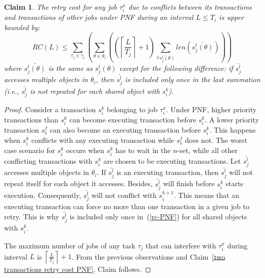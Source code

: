\documentclass[a4paper,english]{article}
\newtheorem{clm}{Claim}
\newtheorem{proof}{Proof}
\begin{document}
\begin{clm}
The retry cost for any job $\tau_{i}^{x}$ due to conflicts between its transactions and transactions of other jobs under PNF during an interval $L\le T_{i}$ is upper bounded by:
\begin{equation}
RC(L)\le\sum_{\tau_{j}\in\gamma_{i}}\left(\sum_{\theta\in\theta_{i}}\left(\left(\left\lceil \frac{L}{T_{j}}\right\rceil +1\right)\sum_{\bar{\forall s_{j}^{l}(\theta)}}len\left(\bar{s_{j}^{l}(\theta)}\right)\right)\right)\label{rc-PNF}
\end{equation}
where $\bar{s_{j}^{l}(\theta)}$ is the same as $s_{j}^{l}(\theta)$ except for the following difference:
 if $\bar{s_{j}^{l}}$ accesses multiple objects in $\theta_{i}$,
then $\bar{s_{j}^{l}}$ is included only once in the last summation (i.e., $\bar{s_j^l}$ is not repeated for each shared object with $s_i^k$).
\end{clm}
\begin{proof}\normalfont
Consider a transaction $s_{i}^{k}$ belonging to job $\tau_{i}^{x}$. Under PNF, higher priority transactions than $s_i^k$ can become executing transaction before $s_i^k$. A lower priority transaction $s_v^f$ can also become an executing transaction before $s_i^k$. This happens when $s_i^k$ conflicts with any executing transaction while $s_v^f$ does not. The worst case scenario for $s_{i}^{k}$ occurs when $s_i^k$ has to wait in the $n$-set, while all other conflicting transactions with $s_i^k$ are chosen to be executing transactions. 
Let $\bar{s_j^l}$ accesses multiple objects in $\theta_i$. If $\bar{s_j^l}$ is an executing transaction, then $\bar{s_j^l}$ will not repeat itself for each object it accesses. Besides, $\bar{s_j^l}$ will finish before $s_i^k$ starts execution. Consequently, $\bar{s_j^l}$ will not conflict with $s_i^{k+1}$. This means that an executing transaction can force no more than one transaction in a given job to retry. This is why $\bar{s_j^l}$ is included only once in~(\ref{rc-PNF}) for all shared objects with $s_i^k$.

The maximum number of jobs of any task $\tau_{j}$ that can interfere with $\tau_{i}^{x}$ during interval $L$ is $\left\lceil \frac{L}{T_{j}}\right\rceil +1$. From  the previous observations and Claim~\ref{two transactions retry cost PNF}, Claim follows.
\end{proof}
\end{document}
